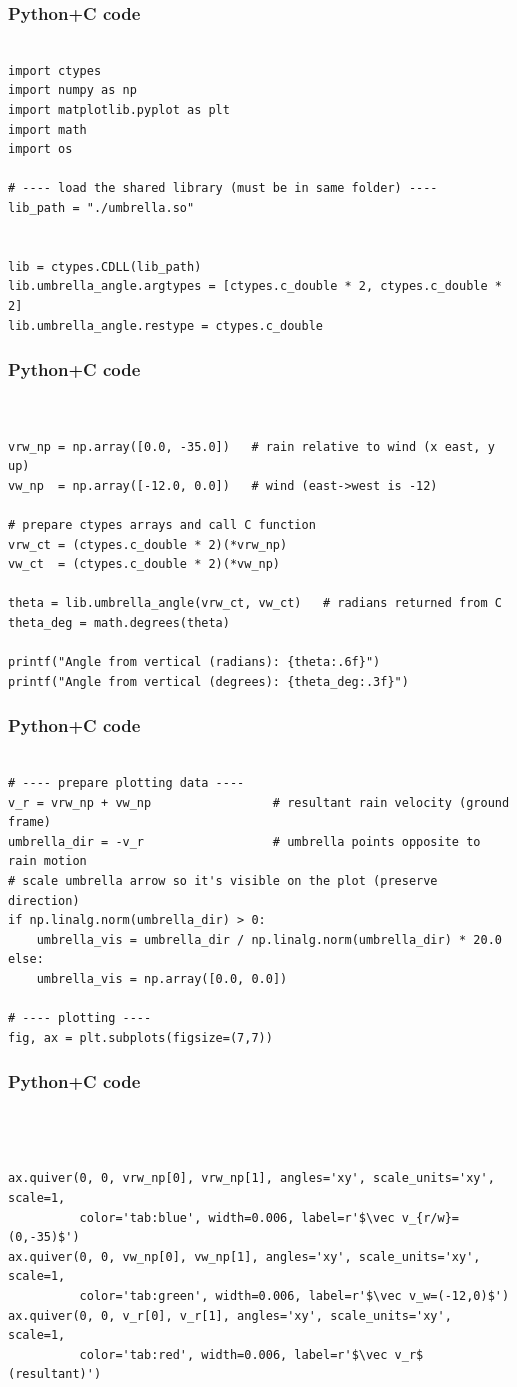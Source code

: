 \documentclass{beamer}
\begin{document}
\begin{frame}[fragile]
    \frametitle{Python+C code}
    \begin{lstlisting}

import ctypes
import numpy as np
import matplotlib.pyplot as plt
import math
import os

# ---- load the shared library (must be in same folder) ----
lib_path = "./umbrella.so"


lib = ctypes.CDLL(lib_path)
lib.umbrella_angle.argtypes = [ctypes.c_double * 2, ctypes.c_double * 2]
lib.umbrella_angle.restype = ctypes.c_double
 \end{lstlisting}
\end{frame}
\begin{frame}[fragile]
    \frametitle{Python+C code}
    \begin{lstlisting}


vrw_np = np.array([0.0, -35.0])   # rain relative to wind (x east, y up)
vw_np  = np.array([-12.0, 0.0])   # wind (east->west is -12)

# prepare ctypes arrays and call C function
vrw_ct = (ctypes.c_double * 2)(*vrw_np)
vw_ct  = (ctypes.c_double * 2)(*vw_np)

theta = lib.umbrella_angle(vrw_ct, vw_ct)   # radians returned from C
theta_deg = math.degrees(theta)

printf("Angle from vertical (radians): {theta:.6f}")
printf("Angle from vertical (degrees): {theta_deg:.3f}")
\end{lstlisting}
\end{frame}
\begin{frame}[fragile]
    \frametitle{Python+C code}
    \begin{lstlisting}

# ---- prepare plotting data ----
v_r = vrw_np + vw_np                 # resultant rain velocity (ground frame)
umbrella_dir = -v_r                  # umbrella points opposite to rain motion
# scale umbrella arrow so it's visible on the plot (preserve direction)
if np.linalg.norm(umbrella_dir) > 0:
    umbrella_vis = umbrella_dir / np.linalg.norm(umbrella_dir) * 20.0
else:
    umbrella_vis = np.array([0.0, 0.0])

# ---- plotting ----
fig, ax = plt.subplots(figsize=(7,7))
\end{lstlisting}
\end{frame}
\begin{frame}[fragile]
    \frametitle{Python+C code}
    \begin{lstlisting}



ax.quiver(0, 0, vrw_np[0], vrw_np[1], angles='xy', scale_units='xy', scale=1,
          color='tab:blue', width=0.006, label=r'$\vec v_{r/w}=(0,-35)$')
ax.quiver(0, 0, vw_np[0], vw_np[1], angles='xy', scale_units='xy', scale=1,
          color='tab:green', width=0.006, label=r'$\vec v_w=(-12,0)$')
ax.quiver(0, 0, v_r[0], v_r[1], angles='xy', scale_units='xy', scale=1,
          color='tab:red', width=0.006, label=r'$\vec v_r$ (resultant)')
\end{lstlisting}
\end{frame}
\end{document}
